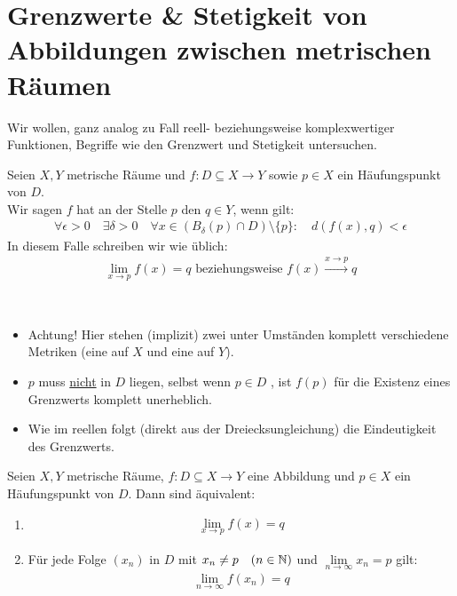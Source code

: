 \section{Grenzwerte \& Stetigkeit von Abbildungen zwischen metrischen Räumen}

Wir wollen, ganz analog zu Fall reell- beziehungsweise komplexwertiger Funktionen, 
Begriffe wie den Grenzwert und Stetigkeit untersuchen.

\begin{Definition}{%
	Seien $X,Y$ metrische Räume und $f: D \subseteq X \rightarrow Y$ sowie $p \in 
	X$ ein Häufungspunkt von $D$.\\
	Wir sagen $f$ hat an der Stelle $p$ den  $q \in Y$, wenn 
	gilt:
	\begin{align*}
		\forall \epsilon > 0 \quad \exists \delta > 0  \quad \forall x 
		\in (B_\delta(p) \cap D) \setminus \{p\}: \quad d(f(x), q) < \epsilon
	\end{align*}
	In diesem Falle schreiben wir wie üblich:
	\begin{align*}
		\lim\limits_{x \rightarrow p}{f(x)} = q \text{ beziehungsweise } 
		f(x) \xrightarrow{x \rightarrow p}q
	\end{align*}
}\end{Definition}

\begin{Bemerkung}{
	~\begin{itemize}
		\item Achtung! Hier stehen (implizit) zwei unter Umständen komplett 
		verschiedene Metriken (eine auf $X$ und eine auf $Y$).
		\item $p$ muss \underline{nicht} in $D$ liegen, selbst wenn $p \in D$ , ist 
		$f(p)$ für die Existenz eines Grenzwerts komplett unerheblich.
		\item Wie im reellen folgt (direkt aus der Dreiecksungleichung) die 
		Eindeutigkeit des Grenzwerts.
	\end{itemize}
}\end{Bemerkung}

\begin{Satz}{%
	Seien $X,Y$ metrische Räume, $f: D \subseteq X \rightarrow Y$ eine Abbildung 
	und $p \in X$ ein Häufungspunkt von $D$. Dann sind äquivalent:
	\begin{enumerate}
		\item \label{vl_24_stp_1} \begin{align*}
				\lim\limits_{x \rightarrow p}{f(x)} = q
			\end{align*}
		\item \label{vl_24_stp_2} Für jede Folge $(x_n)$ in $D$ mit $x_n \neq p 
		\quad (n \in \mathbb{N})$ und $\lim\limits_{n \rightarrow \infty}{x_n}=p$ gilt:
			\begin{align*}
				\lim\limits_{n \rightarrow \infty}{f(x_n)} = q
			\end{align*}
	\end{enumerate}
}\end{Satz}

